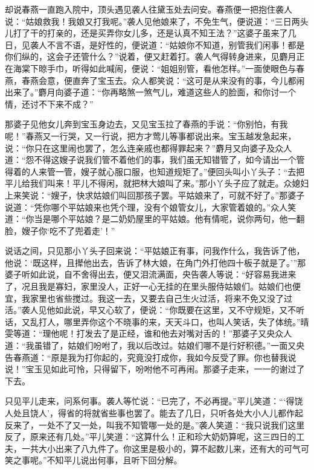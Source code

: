 \documentclass[12pt,oneside]{book}
\begin{document}
却说春燕一直跑入院中，顶头遇见袭人往黛玉处去问安。春燕便一把抱住袭人说：“姑娘救我！我娘又打我呢。”袭人见他娘来了，不免生气，便说道：“三日两头儿打了干的打亲的，还是买弄你女儿多，还是认真不知王法？”这婆子虽来了几日，见袭人不言不语，是好性的，便说道：“姑娘你不知道，别管我们闲事！都是你们纵的，这会子还管什么？”说着，便又赶着打。袭人气得转身进来，见麝月正在海棠下晾手巾，听得如此喊闹，便说：“姐姐别管，看他怎样。”一面使眼色与春燕，春燕会意，便直奔了宝玉去。众人都笑说：“这可是从来没有的事，今儿都闹出来了。”麝月向婆子道：“你再略煞一煞气儿，难道这些人的脸面，和你讨一个情，还讨不下来不成？”

那婆子见他女儿奔到宝玉身边去，又见宝玉拉了春燕的手说：“你别怕，有我呢！”春燕又一行哭，又一行说，把方才莺儿等事都说出来。宝玉越发急起来，说：“你只在这里闹也罢了，怎么连亲戚也都得罪起来？”麝月又向婆子及众人道：“怨不得这嫂子说我们管不着他们的事，我们虽无知错管了，如今请出一个管得着的人来管一管，嫂子就心服口服，也知道规矩了。”便回头叫小丫头子：“去把平儿给我们叫来！平儿不得闲，就把林大娘叫了来。”那小丫头子应了就走。众媳妇上来笑说：“嫂子，快求姑娘们叫回那孩子罢。平姑娘来了，可就不好了。”那婆子说道：“凭你哪个平姑娘来也凭个理，没有个娘管女儿，大家管着娘的。”众人笑道：“你当是哪个平姑娘？是二奶奶屋里的平姑娘。他有情呢，说你两句，他一翻脸，嫂子你‘吃不了兜着走’！”

说话之间，只见那小丫头子回来说：“平姑娘正有事，问我作什么，我告诉了他，他说：‘既这样，且撵他出去，告诉了林大娘，在角门外打他四十板子就是了。’”那婆子听如此说，自不舍得出去，便又泪流满面，央告袭人等说：“好容易我进来了，况且我是寡妇，家里没人，正好一心无挂的在里头服侍姑娘们。姑娘们也便宜，我家里也省些搅过。我这一去，又要去自己生火过活，将来不免又没了过活。”袭人见他如此说，早又心软了，便说：“你既要在这里，又不守规矩，又不听话，又乱打人，哪里弄你这个不晓事的来，天天斗口，也叫人笑话，失了体统。”晴雯等道：“理他呢！打发去了是正经，谁和他去对嘴对舌的！”那婆子又央众人道：“我虽错了，姑娘们吩咐了，我以后改过。姑娘们哪不是行好积德。”一面又央告春燕道：“原是我为打你起的，究竟没打成你，我如今反受了罪。你也替我说说！”宝玉见如此可怜，只得留下，吩咐他不可再闹。那婆子走来，一一的谢过了下去。

只见平儿走来，问系何事。袭人等忙说：“已完了，不必再提。”平儿笑道：“‘得饶人处且饶人’，得省的将就省些事也罢了。能去了几日，只听各处大小人儿都作起反来了，一处不了又一处，叫我不知管哪一处的是。”袭人笑道：“我只说我们这里反了，原来还有几处。”平儿笑道：“这算什么！正和珍大奶奶算呢，这三四日的工夫，一共大小出来了八九件了。你这里是极小的，算不起数儿来，还有大的可气可笑之事呢。”不知平儿说出何事，且听下回分解。
\end{document}
